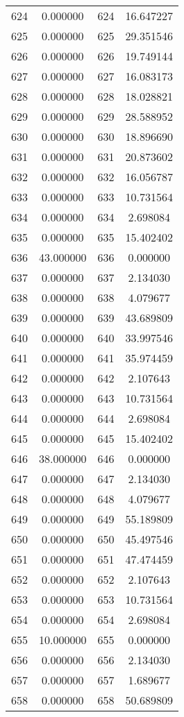 \documentclass[12pt]{article}
\begin{document}
\begin{longtable}{@{}cccc@{}}
624 & 0.000000 & 624 & 16.647227 \\
625 & 0.000000 & 625 & 29.351546 \\
626 & 0.000000 & 626 & 19.749144 \\
627 & 0.000000 & 627 & 16.083173 \\
628 & 0.000000 & 628 & 18.028821 \\
629 & 0.000000 & 629 & 28.588952 \\
630 & 0.000000 & 630 & 18.896690 \\
631 & 0.000000 & 631 & 20.873602 \\
632 & 0.000000 & 632 & 16.056787 \\
633 & 0.000000 & 633 & 10.731564 \\
634 & 0.000000 & 634 & 2.698084 \\
635 & 0.000000 & 635 & 15.402402 \\
636 & 43.000000 & 636 & 0.000000 \\
637 & 0.000000 & 637 & 2.134030 \\
638 & 0.000000 & 638 & 4.079677 \\
639 & 0.000000 & 639 & 43.689809 \\
640 & 0.000000 & 640 & 33.997546 \\
641 & 0.000000 & 641 & 35.974459 \\
642 & 0.000000 & 642 & 2.107643 \\
643 & 0.000000 & 643 & 10.731564 \\
644 & 0.000000 & 644 & 2.698084 \\
645 & 0.000000 & 645 & 15.402402 \\
646 & 38.000000 & 646 & 0.000000 \\
647 & 0.000000 & 647 & 2.134030 \\
648 & 0.000000 & 648 & 4.079677 \\
649 & 0.000000 & 649 & 55.189809 \\
650 & 0.000000 & 650 & 45.497546 \\
651 & 0.000000 & 651 & 47.474459 \\
652 & 0.000000 & 652 & 2.107643 \\
653 & 0.000000 & 653 & 10.731564 \\
654 & 0.000000 & 654 & 2.698084 \\
655 & 10.000000 & 655 & 0.000000 \\
656 & 0.000000 & 656 & 2.134030 \\
657 & 0.000000 & 657 & 1.689677 \\
658 & 0.000000 & 658 & 50.689809 \\

\end{longtable}
\end{document}

